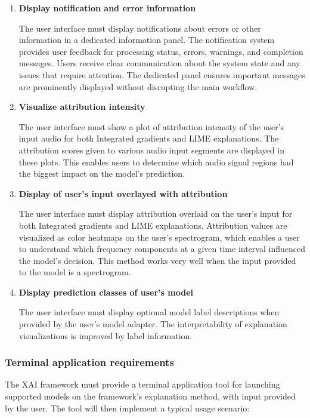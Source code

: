 \documentclass[
    bindingoffset=5mm,  %
    footnoteindent=3mm, %
    hyphenation=true    %
]{src/wut-thesis}
\begin{document}
\begin{enumerate}[itemsep=1\baselineskip]
    \item \textbf{Display notification and error information}

        The user interface must display notifications about errors or other information in a dedicated information
    panel. The notification system provides user feedback for processing status, errors, warnings,
    and completion messages. Users receive clear communication about the system state and any issues that
    require attention. The dedicated panel ensures important messages are prominently displayed without
    disrupting the main workflow.

    \item \textbf{Visualize attribution intensity}

        The user interface must show a plot of attribution intensity of the user's input audio for both
    Integrated gradients and LIME explanations. The attribution scores given to various audio
    input segments are displayed in these plots. This enables users to determine which audio
    signal regions had the biggest impact on the model's prediction.

    \item \textbf{Display of user's input overlayed with attribution}

        The user interface must display attribution overlaid on the user's input for both Integrated
    gradients and LIME explanations. Attribution values are visualized as color heatmaps on the user's
    spectrogram, which enables a user to understand which frequency components at a given time interval
    influenced the model's decision. This method works very well when the input provided to the
    model is a spectrogram.

    \item \textbf{Display prediction classes of user's model}

        The user interface must display optional model label descriptions when provided by
    the user's model adapter. The interpretability of explanation visualizations is
    improved by label information.

    \end{enumerate}

\subsubsection{Terminal application requirements}
    The XAI framework must provide a terminal application tool for launching supported models on
    the framework's explanation method, with input provided by the user. The tool will then
    implement a typical usage scenario:
\end{document}
